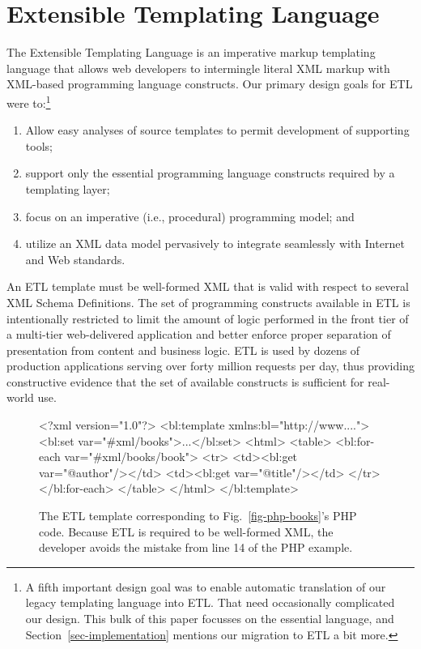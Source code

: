 \documentclass{www2003-submission}
\newcommand{\figref}[1]{Fig.~\ref{fig-#1}}
\newcommand{\secref}[1]{Section~\ref{sec-#1}}
\begin{document}
\section{\hspace*{-.1in}Extensible Templating Language}
\label{sec-etl}

The Extensible Templating Language is an imperative markup templating
language that allows web developers to intermingle literal XML markup
with XML-based programming language constructs.  Our primary design
goals for ETL were to:\footnote{A fifth important design goal was to
enable automatic translation of our legacy templating language into ETL. That
need occasionally complicated our design. This bulk of this paper
focusses on the essential language, and
\secref{implementation} mentions our migration to ETL a bit more.}

\begin{enumerate}
\item Allow easy analyses of source templates to permit development of
supporting tools; 
\item support only the essential programming language constructs
required by a templating layer; 
\item focus on an imperative (i.e., procedural) programming model; and
\item utilize an XML data model pervasively to integrate seamlessly
with Internet and Web standards.
\end{enumerate}

An ETL template must be well-formed XML that is valid with respect to
several XML Schema Definitions.  The set of programming constructs
available in ETL is intentionally restricted to limit the amount of
logic performed in the front tier of a multi-tier web-delivered
application and better enforce proper separation of presentation from
content and business logic.  ETL is used by dozens of production
applications serving over forty million requests per day, thus
providing constructive evidence that the set of available constructs
is sufficient for real-world use.

\begin{figure}[tb]
\begin{listing}{1}
<?xml version="1.0"?>
<bl:template xmlns:bl="http://www....">
 <bl:set var="#xml/books">...</bl:set>
 <html>
  <table>
   <bl:for-each var="#xml/books/book">
    <tr> 
     <td><bl:get var="@author"/></td>
     <td><bl:get var="@title"/></td>
    </tr>
   </bl:for-each>
  </table>
 </html>
</bl:template>
\end{listing}%
\caption{The ETL template corresponding to \figref{php-books}'s PHP
code. Because ETL is required to be well-formed XML, the developer
avoids the mistake from line 14 of the PHP example.
\label{fig-etl-books}}
\end{figure}
\end{document}
